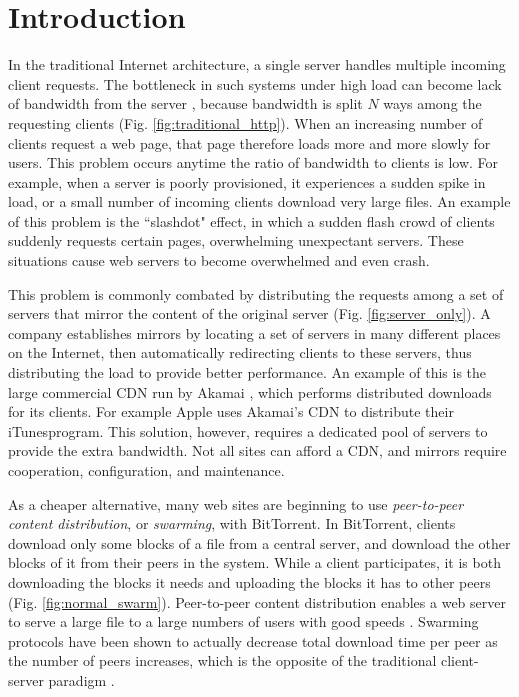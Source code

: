 \section {Introduction}

In the traditional Internet architecture, a single server handles multiple incoming client requests.  
The bottleneck in such systems under high load can become lack of bandwidth from the server \cite{coopnet}, because bandwidth is split $N$ 
ways among the requesting clients (Fig. \ref{fig:traditional_http}).  When an increasing number of clients request a web page, that page 
therefore loads more and more slowly for users.  This problem occurs anytime the ratio of bandwidth to clients is low.  For example, when a server 
is poorly provisioned, it experiences a sudden spike in load, or a small number of incoming clients download very large files.  An example of this problem 
is the ``slashdot" effect, in which a sudden flash crowd of clients suddenly requests certain pages, overwhelming unexpectant servers.  
These situations cause web servers to become overwhelmed and even crash.

This problem is commonly combated by distributing the requests among a set of servers that mirror the content of the original server (Fig. \ref{fig:server_only}).  
A company establishes mirrors by locating a set of servers in many different places on the Internet, then automatically redirecting clients to these servers, thus 
distributing the load to provide better performance.  An example of this is the large commercial CDN run by Akamai \cite{akamai}, which performs distributed
downloads for its clients.  For example Apple uses Akamai's CDN to distribute their iTunes\texttrademark  program.  This solution,  however, requires a dedicated pool of 
servers to provide the extra bandwidth.  Not all sites can afford a CDN, and  mirrors require cooperation, configuration, and maintenance.

As a cheaper alternative, many web sites are beginning to use \emph{peer-to-peer content distribution}, or \emph{swarming}, with BitTorrent.  In BitTorrent, clients 
download only some blocks of a file from a central server, and download the other blocks of it from their peers in the system.  While a client participates, it is both downloading 
the  blocks it needs and uploading the blocks it has to other peers (Fig. \ref{fig:normal_swarm}).  Peer-to-peer content distribution enables a 
web server to serve a large file to a large numbers of users with good speeds \cite{zappala}. Swarming protocols have been shown to actually decrease total download 
time per peer as the number of peers increases, which is the opposite of the traditional client-server paradigm \cite{slurpie}. 

